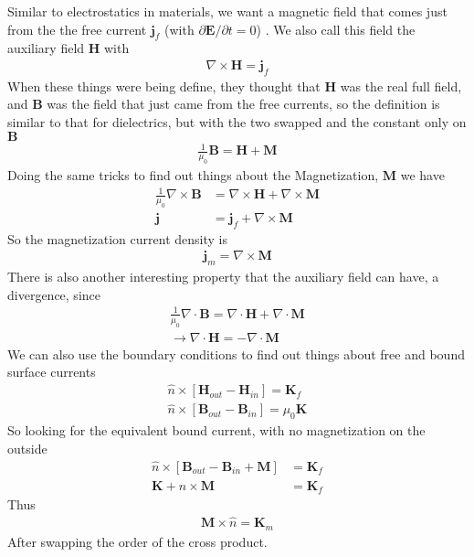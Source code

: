 Similar to electrostatics in materials, we want a magnetic field that comes just from the the free current $\textbf{j}_f$ (with $\partial\textbf{E}/\partial t = 0$) . We also call this field the auxiliary field $\textbf{H}$ with
\begin{align}
\nabla\times\textbf{H} = \textbf{j}_f
\end{align}
When these things were being define, they thought that $\textbf{H}$ was the real full field, and $\textbf{B}$ was the field that just came from the free currents, so the definition is similar to that for dielectrics, but with the two swapped and the constant only on $\textbf{B}$
\begin{align}
\frac{1}{\mu_0}\textbf{B} = \textbf{H} + \textbf{M}
\end{align}
Doing the same tricks to find out things about the Magnetization, $\textbf{M}$ we have
\begin{align}
\frac{1}{\mu_0}\nabla\times\textbf{B} &= \nabla\times\textbf{H} + \nabla\times\textbf{M}\\
\textbf{j} &= \textbf{j}_f + \nabla\times\textbf{M}
\end{align}
So the magnetization current density is
\begin{align}
\textbf{j}_m = \nabla\times\textbf{M}
\end{align}
There is also another interesting property that the auxiliary field can have, a divergence, since
\begin{align}
\frac{1}{\mu_0}\nabla\cdot\textbf{B} = \nabla\cdot\textbf{H} + \nabla\cdot\textbf{M}\\
\rightarrow \nabla\cdot\textbf{H} = -\nabla\cdot\textbf{M}
\end{align}
We can also use the boundary conditions to find out things about free and bound surface currents
\begin{align}
\hat{n}\times[\textbf{H}_{out} - \textbf{H}_{in}] = \textbf{K}_f\\
\hat{n}\times[\textbf{B}_{out} - \textbf{B}_{in}] =\mu_0\textbf{K}
\end{align}
So looking for the equivalent bound current, with no magnetization on the outside
\begin{align}
\hat{n}\times[\textbf{B}_{out}  - \textbf{B}_{in} + \textbf{M}] &= \textbf{K}_f\\
\textbf{K} +\hat{n}\times\textbf{M} &= \textbf{K}_f
\end{align}
Thus
\begin{align}
\textbf{M}\times\hat{n} = \textbf{K}_m
\end{align}
After swapping the order of the cross product.

